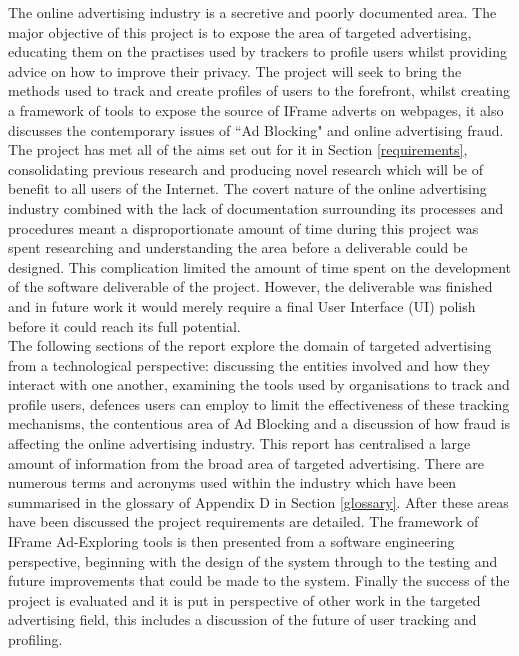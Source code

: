 \documentclass[12pt]{article}
\begin{document}
The online advertising industry is a secretive and poorly documented area. The major objective of this project is to expose the area of targeted advertising, educating them on the practises used by trackers to profile users whilst providing advice on how to improve their privacy. The project will seek to bring the methods used to track and create profiles of users to the forefront, whilst creating a framework of tools to expose the source of IFrame adverts on webpages, it also discusses the contemporary issues of ``Ad Blocking" and online advertising fraud. The project has met all of the aims set out for it in Section \ref{requirements}, consolidating previous research and producing novel research which will be of benefit to all users of the Internet. The covert nature of the online advertising industry combined with the lack of documentation surrounding its processes and procedures meant a disproportionate amount of time during this project was spent researching and understanding the area before a deliverable could be designed. This complication limited the amount of time spent on the development of the software deliverable of the project. However, the deliverable was finished and in future work it would merely require a final User Interface (UI) polish before it could reach its full potential.   \\

The following sections of the report explore the domain of targeted advertising from a technological perspective: discussing the entities involved and how they interact with one another, examining the tools used by organisations to track and profile users, defences users can employ to limit the effectiveness of these tracking mechanisms, the contentious area of Ad Blocking and a discussion of how fraud is affecting the online advertising industry. This report has centralised a large amount of information from the broad area of targeted advertising. There are numerous terms and acronyms used within the industry which have been summarised in the glossary of Appendix D in Section \ref{glossary}. After these areas have been discussed the project requirements are detailed. The framework of IFrame Ad-Exploring tools is then presented from a software engineering perspective, beginning with the design of the system through to the testing and future improvements that could be made to the system. Finally the success of the project is evaluated and it is put in perspective of other work in the targeted advertising field, this includes a discussion of the future of user tracking and profiling.  
\end{document}
